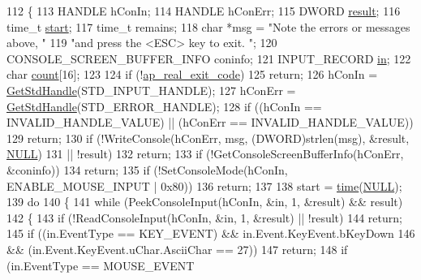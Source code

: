 \begin{DoxyCode}
112 \{
113     HANDLE hConIn;
114     HANDLE hConErr;
115     DWORD \hyperlink{group__APACHE__CORE__MPM_ga9f5959dd76d5c83e775dcf44de684686}{result};
116     time\_t \hyperlink{group__APACHE__CORE__DAEMON_ga6d3a995932cd00f6b3473898aa90d596}{start};
117     time\_t remains;
118     \textcolor{keywordtype}{char} *msg = \textcolor{stringliteral}{"Note the errors or messages above, "}
119                 \textcolor{stringliteral}{"and press the <ESC> key to exit.  "};
120     CONSOLE\_SCREEN\_BUFFER\_INFO coninfo;
121     INPUT\_RECORD \hyperlink{group__apr__thread__proc_ga2e46fea00cc2238744ebca5061c62bcc}{in};
122     \textcolor{keywordtype}{char} \hyperlink{group__APR__MD5_ga16ff2d8e15ade4948398b0aeb80124a8}{count}[16];
123 
124     \textcolor{keywordflow}{if} (!\hyperlink{service_8c_a8af0bdcd9be4099e91099a3e45f5aa4c}{ap\_real\_exit\_code})
125         \textcolor{keywordflow}{return};
126     hConIn = \hyperlink{apr__dbg__win32__handles_8h_a16fcc45598adb71ea9a265ce05b200bb}{GetStdHandle}(STD\_INPUT\_HANDLE);
127     hConErr = \hyperlink{apr__dbg__win32__handles_8h_a16fcc45598adb71ea9a265ce05b200bb}{GetStdHandle}(STD\_ERROR\_HANDLE);
128     \textcolor{keywordflow}{if} ((hConIn == INVALID\_HANDLE\_VALUE) || (hConErr == INVALID\_HANDLE\_VALUE))
129         \textcolor{keywordflow}{return};
130     \textcolor{keywordflow}{if} (!WriteConsole(hConErr, msg, (DWORD)strlen(msg), &result, \hyperlink{pcre_8txt_ad7f989d16aa8ca809a36bc392c07fba1}{NULL}) 
131             || !result)
132         \textcolor{keywordflow}{return};
133     \textcolor{keywordflow}{if} (!GetConsoleScreenBufferInfo(hConErr, &coninfo))
134         \textcolor{keywordflow}{return};
135     \textcolor{keywordflow}{if} (!SetConsoleMode(hConIn, ENABLE\_MOUSE\_INPUT | 0x80))
136         \textcolor{keywordflow}{return};
137 
138     start = \hyperlink{pcre_8txt_aafdc0b2481cb13eb2e0183db31aa1c5d}{time}(\hyperlink{pcre_8txt_ad7f989d16aa8ca809a36bc392c07fba1}{NULL});
139     \textcolor{keywordflow}{do}
140     \{
141         \textcolor{keywordflow}{while} (PeekConsoleInput(hConIn, &in, 1, &result) && result)
142         \{
143             \textcolor{keywordflow}{if} (!ReadConsoleInput(hConIn, &in, 1, &result) || !result)
144                 \textcolor{keywordflow}{return};
145             \textcolor{keywordflow}{if} ((in.EventType == KEY\_EVENT) && in.Event.KeyEvent.bKeyDown
146                     && (in.Event.KeyEvent.uChar.AsciiChar == 27))
147                 \textcolor{keywordflow}{return};
148             \textcolor{keywordflow}{if} (in.EventType == MOUSE\_EVENT

\end{DoxyCode}
